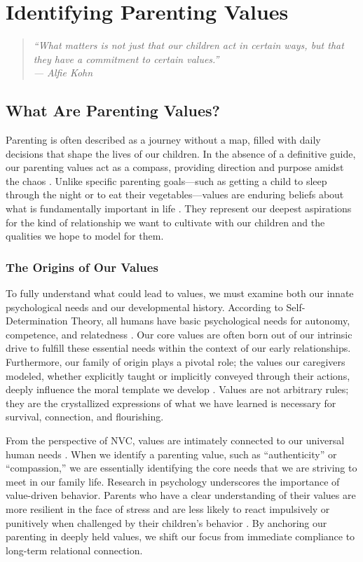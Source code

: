 \chapter{Identifying Parenting Values}

\begin{quote}
\itshape ``What matters is not just that our children act in certain ways, but that they have a commitment to certain values.''\\
\upshape --- Alfie Kohn
\end{quote}

\newpage
\section{What Are Parenting Values?}

Parenting is often described as a journey without a map, filled with daily decisions that shape the lives of our children.
In the absence of a definitive guide, our parenting values act as a compass, providing direction and purpose amidst the chaos \citep{kohn2005}.
Unlike specific parenting goals---such as getting a child to sleep through the night or to eat their vegetables---values are enduring beliefs about what is fundamentally important in life \citep{schwartz2012}.
They represent our deepest aspirations for the kind of relationship we want to cultivate with our children and the qualities we hope to model for them.

\subsection{The Origins of Our Values}

To fully understand what could lead to values, we must examine both our innate psychological needs and our developmental history.
According to Self-Determination Theory, all humans have basic psychological needs for autonomy, competence, and relatedness \citep{ryan2017}.
Our core values are often born out of our intrinsic drive to fulfill these essential needs within the context of our early relationships.
Furthermore, our family of origin plays a pivotal role; the values our caregivers modeled, whether explicitly taught or implicitly conveyed through their actions, deeply influence the moral template we develop \citep{hoffman2000}.
Values are not arbitrary rules; they are the crystallized expressions of what we have learned is necessary for survival, connection, and flourishing.

From the perspective of NVC, values are intimately connected to our universal human needs \citep{rosenberg2003}.
When we identify a parenting value, such as ``authenticity'' or ``compassion,'' we are essentially identifying the core needs that we are striving to meet in our family life.
Research in psychology underscores the importance of value-driven behavior.
Parents who have a clear understanding of their values are more resilient in the face of stress and are less likely to react impulsively or punitively when challenged by their children's behavior \citep{brown2012}.
By anchoring our parenting in deeply held values, we shift our focus from immediate compliance to long-term relational connection.

